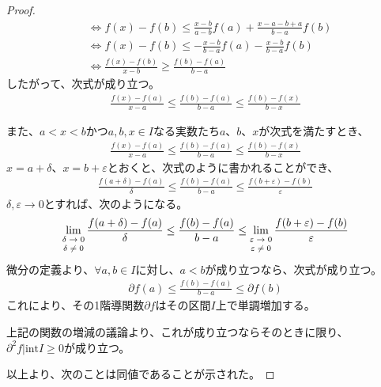 \documentclass[dvipdfmx]{jsarticle}
\begin{document}
\begin{proof}
\begin{align*}
&\Leftrightarrow f(x) - f(b) \leq \frac{x - b}{a - b}f(a) + \frac{x - a - b + a}{b - a}f(b)\\
&\Leftrightarrow f(x) - f(b) \leq - \frac{x - b}{b - a}f(a) - \frac{x - b}{b - a}f(b)\\
&\Leftrightarrow \frac{f(x) - f(b)}{x - b} \geq \frac{f(b) - f(a)}{b - a}
\end{align*}
したがって、次式が成り立つ。
\begin{align*}
\frac{f(x) - f(a)}{x - a} \leq \frac{f(b) - f(a)}{b - a} \leq \frac{f(b) - f(x)}{b - x}
\end{align*}\par
また、$a < x < b$かつ$a,b,x \in I$なる実数たち$a$、$b$、$x$が次式を満たすとき、
\begin{align*}
\frac{f(x) - f(a)}{x - a} \leq \frac{f(b) - f(a)}{b - a} \leq \frac{f(b) - f(x)}{b - x}
\end{align*}
$x = a + \delta$、$x = b + \varepsilon$とおくと、次式のように書かれることができ、
\begin{align*}
\frac{f(a + \delta) - f(a)}{\delta} \leq \frac{f(b) - f(a)}{b - a} \leq \frac{f(b + \varepsilon) - f(b)}{\varepsilon}
\end{align*}
$\delta,\varepsilon \rightarrow 0$とすれば、次のようになる。
\begin{align*}
\lim_{\scriptsize \begin{matrix}
\delta \rightarrow 0 \\
\delta \neq 0 \\
\end{matrix}}\frac{f(a + \delta) - f(a)}{\delta} \leq \frac{f(b) - f(a)}{b - a} \leq \lim_{\scriptsize \begin{matrix}
\varepsilon \rightarrow 0 \\
\varepsilon \neq 0 \\
\end{matrix}}\frac{f(b + \varepsilon) - f(b)}{\varepsilon}
\end{align*}
微分の定義より、$\forall a,b \in I$に対し、$a < b$が成り立つなら、次式が成り立つ。
\begin{align*}
\partial f(a) \leq \frac{f(b) - f(a)}{b - a} \leq \partial f(b)
\end{align*}
これにより、その1階導関数$\partial f$はその区間$I$上で単調増加する。\par
上記の関数の増減の議論より、これが成り立つならそのときに限り、$\partial^{2}f|\mathrm{int}I \geq 0$が成り立つ。\par
以上より、次のことは同値であることが示された。

\end{proof}
\end{document}
